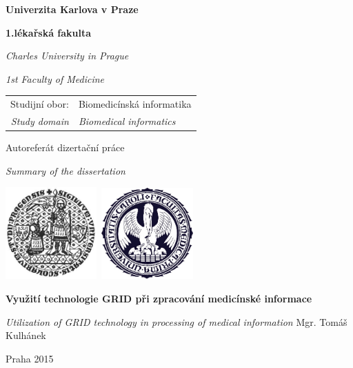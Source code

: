 \begin{center}
\large
\textbf{\Large{Univerzita Karlova v Praze}}

\textbf{\Large{1.lékařská fakulta}} 

\textit{Charles University in Prague} 

\textit{1st Faculty of Medicine}
\vfill
\normalsize
\begin{tabular}{rl}
Studijní obor:  & Biomedicínská informatika \\
\noalign{\vspace{-1mm}}
\textit{Study domain} & \textit{Biomedical informatics} \\
\end{tabular}

\vfill

{\Large Autoreferát dizertační práce}

\textit{\large Summary of the dissertation}

\centerline{\mbox{\includegraphics[width=35mm]{img/logouk.jpg}
\includegraphics[width=35mm]{img/logolf1.jpg}}}

\vfill



\textbf{\large Využití technologie GRID při zpracování medicínské informace}

\vspace{2mm}
\textit{\large Utilization of GRID technology in processing of medical information}
\vfill
{\Large Mgr. Tomáš Kulhánek}




\vfill

Praha 2015

\end{center}
